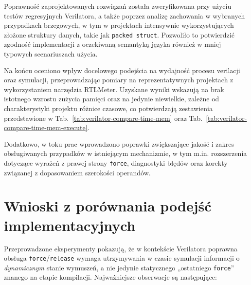 \documentclass[shortabstract, inz]{iithesis}
\begin{document}
Poprawność zaprojektowanych rozwiązań została zweryfikowana przy użyciu testów regresyjnych Verilatora, a także poprzez analizę zachowania w wybranych przypadkach brzegowych, w tym w projektach intensywnie wykorzystujących złożone struktury danych, takie jak \texttt{packed struct}. Pozwoliło to potwierdzić zgodność implementacji z oczekiwaną semantyką języka również w mniej typowych scenariuszach użycia.

Na końcu oceniono wpływ docelowego podejścia na wydajność procesu verilacji oraz symulacji, przeprowadzając pomiary na reprezentatywnych projektach z wykorzystaniem narzędzia RTLMeter. Uzyskane wyniki wskazują na brak istotnego wzrostu zużycia pamięci oraz na jedynie niewielkie, zależne od charakterystyki projektu różnice czasowe, co potwierdzają zestawienia przedstawione w Tab.~\ref{tab:verilator-compare-time-mem} oraz Tab.~\ref{tab:verilator-compare-time-mem-execute}.

Dodatkowo, w toku prac wprowadzono poprawki zwiększające jakość i zakres obsługiwanych przypadków w istniejącym mechanizmie, w tym m.in. rozszerzenia dotyczące wyrażeń z prawej strony \texttt{force}, diagnostyki błędów oraz korekty związanej z dopasowaniem szerokości operandów.

\section{Wnioski z porównania podejść implementacyjnych}

Przeprowadzone eksperymenty pokazują, że w kontekście Verilatora poprawna obsługa \texttt{force}/\texttt{release} wymaga utrzymywania w czasie symulacji informacji o \emph{dynamicznym} stanie wymuszeń, a nie jedynie statycznego „ostatniego \texttt{force}” znanego na etapie kompilacji. Najważniejsze obserwacje są następujące:
\end{document}

